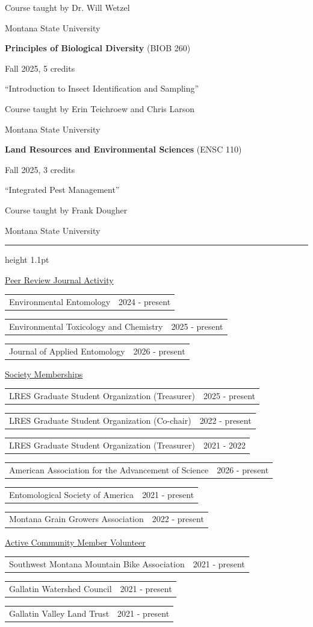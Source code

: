 \documentclass[10pt,letterpaper]{article}
\makeatletter
\newcommand{\cvsection}[1]{\par\vspace{11pt}{\large\bfseries\MakeUppercase{#1}}\par\vspace{1pt}\hrule height 1.1pt\vspace{6pt}\nopagebreak[4]}
\newcommand{\cvsub}[1]{\par\vspace{3pt}\uline{#1}\par\nopagebreak[4]\vspace{3pt}}
\newcommand{\cvrow}[2]{\noindent\begin{tabularx}{\linewidth}{@{}X@{\hspace{1em}}r@{}}#1 & #2\end{tabularx}\par\vspace{-1pt}}
\makeatother
\begin{document}
\noindent Course taught by Dr. Will Wetzel\par
\noindent Montana State University\par
\vspace{5pt}
\noindent\textbf{Principles of Biological Diversity} (BIOB 260)\par
\noindent Fall 2025, 5 credits\par
\noindent “Introduction to Insect Identification and Sampling”\par
\noindent Course taught by Erin Teichroew and Chris Larson\par
\noindent Montana State University\par
\vspace{5pt}
\noindent\textbf{Land Resources and Environmental Sciences} (ENSC 110)\par
\noindent Fall 2025, 3 credits\par
\noindent “Integrated Pest Management”\par
\noindent Course taught by Frank Dougher\par
\noindent Montana State University\par
\vspace{5pt}

\cvsection{Service}
\cvsub{Peer Review Journal Activity}
\cvrow{Environmental Entomology}{2024 - present}
\cvrow{Environmental Toxicology and Chemistry}{2025 - present}
\cvrow{Journal of Applied Entomology}{2026 - present}
\vspace{4pt}
\cvsub{Society Memberships}
\cvrow{LRES Graduate Student Organization (Treasurer)}{2025 - present}
\cvrow{LRES Graduate Student Organization (Co-chair)}{2022 - present}
\cvrow{LRES Graduate Student Organization (Treasurer)}{2021 - 2022}
\cvrow{American Association for the Advancement of Science}{2026 - present}
\cvrow{Entomological Society of America}{2021 - present}
\cvrow{Montana Grain Growers Association}{2022 - present}
\vspace{4pt}
\cvsub{Active Community Member Volunteer}
\cvrow{Southwest Montana Mountain Bike Association}{2021 - present}
\cvrow{Gallatin Watershed Council}{2021 - present}
\cvrow{Gallatin Valley Land Trust}{2021 - present}
\vspace{4pt}
\end{document}

